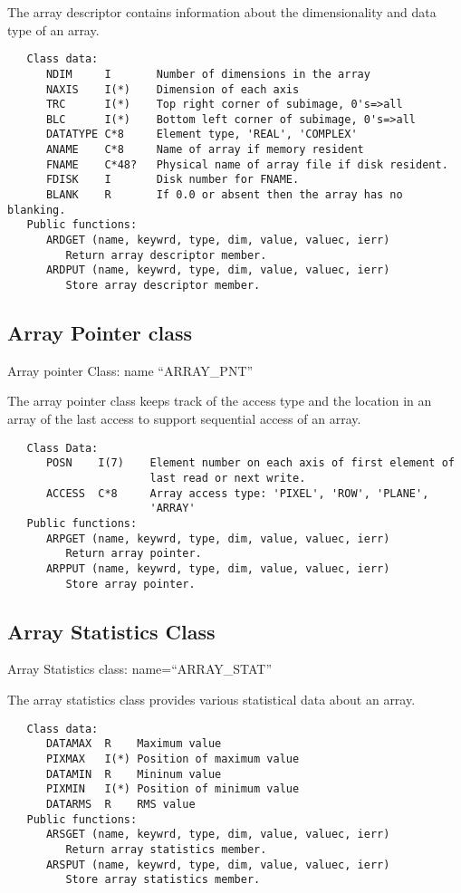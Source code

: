 The array descriptor contains information about the dimensionality and
data type of an array.
{\small\begin{verbatim}
   Class data:
      NDIM     I       Number of dimensions in the array
      NAXIS    I(*)    Dimension of each axis
      TRC      I(*)    Top right corner of subimage, 0's=>all
      BLC      I(*)    Bottom left corner of subimage, 0's=>all
      DATATYPE C*8     Element type, 'REAL', 'COMPLEX'
      ANAME    C*8     Name of array if memory resident
      FNAME    C*48?   Physical name of array file if disk resident.
      FDISK    I       Disk number for FNAME.
      BLANK    R       If 0.0 or absent then the array has no blanking.
   Public functions:
      ARDGET (name, keywrd, type, dim, value, valuec, ierr)
         Return array descriptor member.
      ARDPUT (name, keywrd, type, dim, value, valuec, ierr)
         Store array descriptor member.
\end{verbatim}}

\subsection{Array Pointer class}
   Array pointer Class:  name ``ARRAY\_PNT''

The array pointer class keeps track of the access type and the
location in an array of the last access to support sequential access
of an array.
{\small\begin{verbatim}
   Class Data:
      POSN    I(7)    Element number on each axis of first element of
                      last read or next write.
      ACCESS  C*8     Array access type: 'PIXEL', 'ROW', 'PLANE',
                      'ARRAY'
   Public functions:
      ARPGET (name, keywrd, type, dim, value, valuec, ierr)
         Return array pointer.
      ARPPUT (name, keywrd, type, dim, value, valuec, ierr)
         Store array pointer.
\end{verbatim}}

\subsection{Array Statistics Class}
   Array Statistics class: name=``ARRAY\_STAT''

   The array statistics class provides various statistical data about
an array.
{\small\begin{verbatim}
   Class data:
      DATAMAX  R    Maximum value
      PIXMAX   I(*) Position of maximum value
      DATAMIN  R    Mininum value
      PIXMIN   I(*) Position of minimum value
      DATARMS  R    RMS value
   Public functions:
      ARSGET (name, keywrd, type, dim, value, valuec, ierr)
         Return array statistics member.
      ARSPUT (name, keywrd, type, dim, value, valuec, ierr)
         Store array statistics member.
\end{verbatim}}

